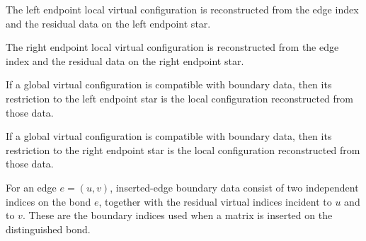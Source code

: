\begin{definition}%
    \label{def:peps_edgeLeftLocalConfig}
    \leanok
    The left endpoint local virtual configuration is reconstructed from the
    edge index and the residual data on the left endpoint star.
\end{definition}

\begin{definition}%
    \label{def:peps_edgeRightLocalConfig}
    \leanok
    The right endpoint local virtual configuration is reconstructed from the
    edge index and the residual data on the right endpoint star.
\end{definition}

\begin{theorem}%
    \label{thm:peps_edgeLeftLocalConfig_eq_of_boundaryMatches}
    \leanok
    If a global virtual configuration is compatible with boundary data, then its
    restriction to the left endpoint star is the local configuration reconstructed
    from those data.
\end{theorem}

\begin{theorem}%
    \label{thm:peps_edgeRightLocalConfig_eq_of_boundaryMatches}
    \leanok
    If a global virtual configuration is compatible with boundary data, then its
    restriction to the right endpoint star is the local configuration
    reconstructed from those data.
\end{theorem}

\begin{definition}%
    \label{def:peps_edgeInsertedBoundaryConfig}
    \leanok
    For an edge $e=(u,v)$, inserted-edge boundary data consist of two
    independent indices on the bond $e$, together with the residual virtual
    indices incident to $u$ and to $v$. These are the boundary indices used
    when a matrix is inserted on the distinguished bond.
\end{definition}

